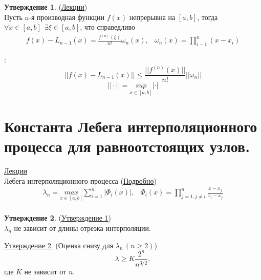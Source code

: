 \documentclass[specialist, subf, href, colorlinks=true, 12pt, times, mtpro, final]{disser}
\theoremstyle{definition}
\newtheorem{state}{Утверждение}[section]
\begin{document}
    \begin{state} (\hyperlink {lects.16}{Лекции})\\
    Пусть n-я производная функции $f(x)$ непрерывна на $[a,b]$, тогда $\forall x \in [a,b] \ \  \exists \xi \in [a,b]$, что справедливо
        $$
            \begin{array}{lr}
            f(x) - L_{n-1}(x) = \frac {f^{(n)}(\xi)}{n!} \omega_n(x), & \omega_n(x) = \prod\limits_{i - 1}^{n}(x-x_i)
            \end{array}
        $$
    \end{state}
    :
    $$
        ||f(x) - L_{n-1}(x) || \le \frac{||f^{(n)}(x)||}{n!} ||\omega_n||
    $$
    $$
        ||\cdot|| = \underset{x\in [a,b]}{sup} |\cdot|
    $$


\section {Константа Лебега интерполяционного процесса для равноотстоящих узлов.}
    \hyperlink {lects.17}{Лекции}\\
    { Лебега интерполяционного процесса} (\hyperlink {lects.17}{Подробно})
    $$
        \begin{array}{lr}
        \lambda_n = \underset{x\in [a,b]}{max} \sum\limits_{i = 1}^n |\Phi_i(x)|, & \Phi_i(x) = \prod\limits_{j = 1, j\ne i}^{n} \frac{x-x_j}{x_i - x_j} \\
        \end{array}
    $$
    
    \begin{state} (\hyperlink {lects.17}{Утверждение 1})\\
    $\lambda_n$ не зависит от длины отрезка интерполяции.
    \end{state}
    
    \noindent \hyperlink{lects.17}{Утверждение 2.} (Оценка снизу для $\lambda_n\,(n\ge 2)$)
    $$
        \lambda \ge K \frac {2^n}{n^{3/2}}, 
    $$ 
    где $K$ не зависит от $n$. \\
    
\end{document}

